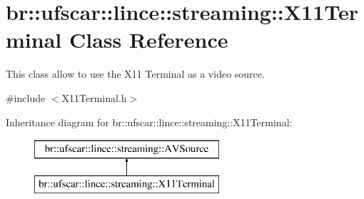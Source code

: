 \hypertarget{classbr_1_1ufscar_1_1lince_1_1streaming_1_1X11Terminal}{
\section{br::ufscar::lince::streaming::X11Terminal Class Reference}
\label{classbr_1_1ufscar_1_1lince_1_1streaming_1_1X11Terminal}
}


This class allow to use the X11 Terminal as a video source.  




{\ttfamily \#include $<$X11Terminal.h$>$}

Inheritance diagram for br::ufscar::lince::streaming::X11Terminal:\begin{figure}[H]
\begin{center}
\leavevmode
\includegraphics[height=2cm]{classbr_1_1ufscar_1_1lince_1_1streaming_1_1X11Terminal}
\end{center}
\end{figure}
